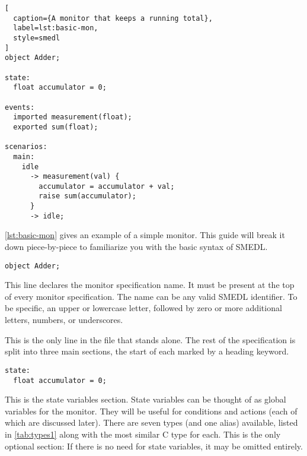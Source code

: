 \documentclass[paper=letter,titlepage,captions=tableheading]{scrartcl}
\begin{document}
\begin{lstlisting}[
  caption={A monitor that keeps a running total},
  label=lst:basic-mon,
  style=smedl
]
object Adder;

state:
  float accumulator = 0;

events:
  imported measurement(float);
  exported sum(float);

scenarios:
  main:
    idle
      -> measurement(val) {
        accumulator = accumulator + val;
        raise sum(accumulator);
      }
      -> idle;
\end{lstlisting}

\autoref{lst:basic-mon} gives an example of a simple monitor. This guide
will break it down piece-by-piece to familiarize you with the basic syntax of
SMEDL.

\begin{lstlisting}[firstnumber=1,style=smedlfixed]
object Adder;
\end{lstlisting}

This line declares the monitor specification name. It must be present at the
top of every monitor specification. The name can be any valid SMEDL identifier.
To be specific, an upper or lowercase letter, followed by zero or more
additional letters, numbers, or underscores.

This is the only line in the file that stands alone. The rest of the specification is split into three main sections, the start of each marked by a heading
keyword.

\begin{lstlisting}[firstnumber=3,style=smedlfixed]
state:
  float accumulator = 0;
\end{lstlisting}

This is the state variables section. State variables can be thought of as
global variables for the monitor. They will be useful for conditions and
actions (each of which are discussed later). There are seven types (and one
alias) available, listed in \autoref{tab:types1} along with the most similar C
type for each. This is the only optional section: If there is no need for state
variables, it may be omitted entirely.

\end{document}

